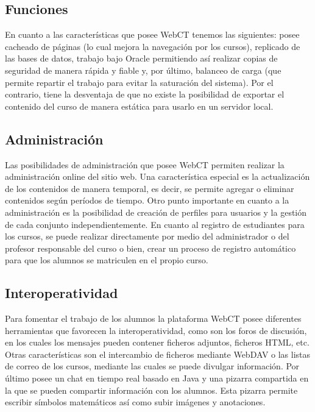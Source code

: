 \subsection{Funciones}

En cuanto a las características que posee WebCT tenemos las siguientes: posee cacheado de páginas (lo cual mejora la navegación por los cursos), replicado de las bases de datos, trabajo bajo Oracle permitiendo así realizar copias de seguridad de manera rápida y fiable y, por último, balanceo de carga (que permite repartir el trabajo para evitar la saturación del sistema). Por el contrario, tiene la desventaja de que no existe la posibilidad de exportar el contenido del curso de manera estática para usarlo en un servidor local.

\subsection{Administración}

Las posibilidades de administración que posee WebCT permiten realizar la administración online del sitio web. Una característica especial es la actualización de los contenidos de manera temporal, es decir, se permite agregar o eliminar contenidos según períodos de tiempo. Otro punto importante en cuanto a la administración es la posibilidad de creación de perfiles para usuarios y la gestión de cada conjunto independientemente. En cuanto al registro de estudiantes para los cursos, se puede realizar directamente por medio del administrador o del profesor responsable del curso o bien, crear un proceso de registro automático para que los alumnos se matriculen en el propio curso.

\subsection{Interoperatividad}

Para fomentar el trabajo de los alumnos la plataforma WebCT posee diferentes herramientas que favorecen la interoperatividad, como son los foros de discusión, en los cuales los mensajes pueden contener ficheros adjuntos, ficheros HTML, etc. Otras características son el intercambio de ficheros mediante WebDAV o las listas de correo de los cursos, mediante las cuales se puede divulgar información. Por último posee un chat en tiempo real basado en Java y una pizarra compartida en la que se pueden compartir información con los alumnos. Esta pizarra permite escribir símbolos matemáticos así como subir imágenes y anotaciones.

